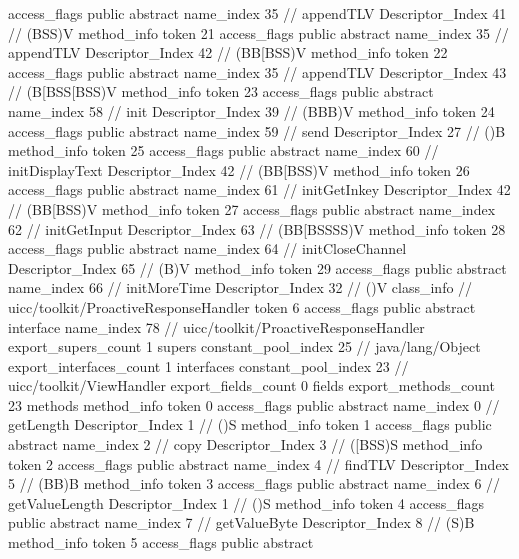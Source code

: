 {{{{{					access_flags	public abstract
					name_index	35		// appendTLV
					Descriptor_Index	41		// (BSS)V
				}
				method_info {
					token	21
					access_flags	public abstract
					name_index	35		// appendTLV
					Descriptor_Index	42		// (BB[BSS)V
				}
				method_info {
					token	22
					access_flags	public abstract
					name_index	35		// appendTLV
					Descriptor_Index	43		// (B[BSS[BSS)V
				}
				method_info {
					token	23
					access_flags	public abstract
					name_index	58		// init
					Descriptor_Index	39		// (BBB)V
				}
				method_info {
					token	24
					access_flags	public abstract
					name_index	59		// send
					Descriptor_Index	27		// ()B
				}
				method_info {
					token	25
					access_flags	public abstract
					name_index	60		// initDisplayText
					Descriptor_Index	42		// (BB[BSS)V
				}
				method_info {
					token	26
					access_flags	public abstract
					name_index	61		// initGetInkey
					Descriptor_Index	42		// (BB[BSS)V
				}
				method_info {
					token	27
					access_flags	public abstract
					name_index	62		// initGetInput
					Descriptor_Index	63		// (BB[BSSSS)V
				}
				method_info {
					token	28
					access_flags	public abstract
					name_index	64		// initCloseChannel
					Descriptor_Index	65		// (B)V
				}
				method_info {
					token	29
					access_flags	public abstract
					name_index	66		// initMoreTime
					Descriptor_Index	32		// ()V
				}
			}
		}
		class_info {		// uicc/toolkit/ProactiveResponseHandler
			token	6
			access_flags	public abstract interface
			name_index	78		// uicc/toolkit/ProactiveResponseHandler
			export_supers_count	1
			supers {
				constant_pool_index	25		// java/lang/Object
			}
			export_interfaces_count	1
			interfaces {
				constant_pool_index	23		// uicc/toolkit/ViewHandler
			}
			export_fields_count	0
			fields {
			}
			export_methods_count	23
			methods {
				method_info {
					token	0
					access_flags	public abstract
					name_index	0		// getLength
					Descriptor_Index	1		// ()S
				}
				method_info {
					token	1
					access_flags	public abstract
					name_index	2		// copy
					Descriptor_Index	3		// ([BSS)S
				}
				method_info {
					token	2
					access_flags	public abstract
					name_index	4		// findTLV
					Descriptor_Index	5		// (BB)B
				}
				method_info {
					token	3
					access_flags	public abstract
					name_index	6		// getValueLength
					Descriptor_Index	1		// ()S
				}
				method_info {
					token	4
					access_flags	public abstract
					name_index	7		// getValueByte
					Descriptor_Index	8		// (S)B
				}
				method_info {
					token	5
					access_flags	public abstract
}}}}}
